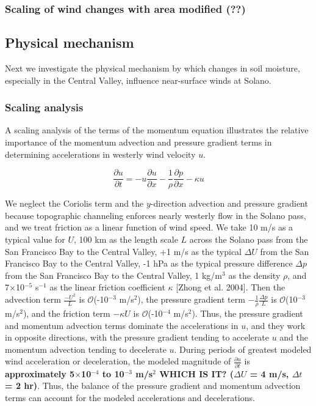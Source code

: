 \subsubsection{Scaling of wind changes with area modified (??)}

\subsection{Physical mechanism}
\label{subsec:PhysMech}

Next we investigate the physical mechanism by which changes in soil moisture, especially in the Central Valley, influence near-surface winds at Solano.  

\subsubsection{Scaling analysis}

A scaling analysis of the terms of the momentum equation illustrates the relative importance of the momentum advection and pressure gradient terms in determining accelerations in westerly wind velocity $u$.  

\begin{equation}
\frac{\partial u}{\partial t} = -u\frac{\partial u}{\partial x} -\frac{1}{\rho} \frac{\partial p}{\partial x} - \kappa u
\end{equation}

We neglect the Coriolis term and the $y$-direction advection and pressure gradient because topographic channeling enforces nearly westerly flow in the Solano pass, and we treat friction as a linear function of wind speed.  We take 10 m/s as a typical value for $U$, 100 km as the length scale $L$ across the Solano pass from the San Francisco Bay to the Central Valley, +1 m/s as the typical $\Delta U$ from the San Francisco Bay to the Central Valley, -1 hPa as the typical pressure difference $\Delta p$ from the San Francisco Bay to the Central Valley, 1 kg/m$^3$ as the density $\rho$, and 7$\times$10$^{-5}$ s$^{-1}$ as the linear friction coefficient $\kappa$ [Zhong et al. 2004]. Then the advection term $\frac{-U^2}{L}$ is $\mathcal{O}$(-10$^{-3}$ m/s$^2$), the pressure gradient term $-\frac{1}{\rho} \frac{\Delta p}{L}$ is $\mathcal{O}$(10$^{-3}$ m/s$^2$), and the friction term $-\kappa U$ is $\mathcal{O}$(-10$^{-4}$ m/s$^2$).  Thus, the pressure gradient and momentum advection terms dominate the accelerations in $u$, and they work in opposite directions, with the pressure gradient tending to accelerate $u$ and the momentum advection tending to decelerate $u$.  During periods of greatest modeled wind acceleration or deceleration, the modeled magnitude of $\frac{\partial u}{\partial t}$ is \textbf{approximately 5$\times$10$^{-4}$ to 10$^{-3}$ m/s$^2$ WHICH IS IT? ($\Delta U$ = 4 m/s, $\Delta t$ = 2 hr)}.  Thus, the balance of the pressure gradient and momentum advection terms can account for the modeled accelerations and decelerations.

